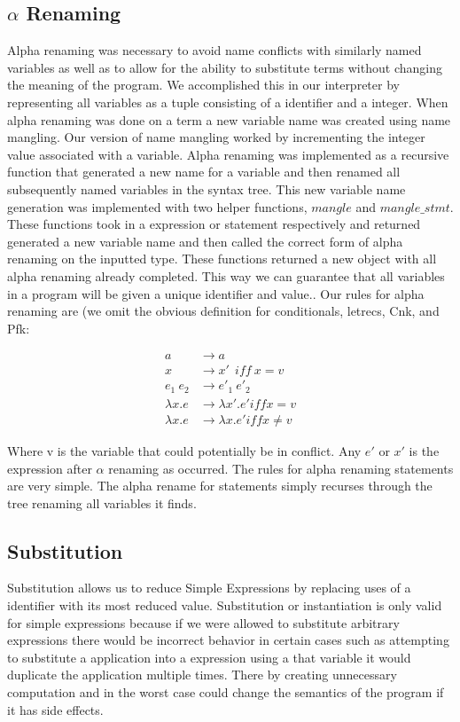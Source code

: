 \documentclass[preprint]{sigplanconf}
\begin{document}
\subsection{$\alpha$ Renaming}
Alpha renaming was necessary to avoid name conflicts with similarly named variables as well as to allow for the ability to substitute terms without changing the meaning of the program. We accomplished this in our interpreter by representing all variables as a tuple consisting of a identifier and a integer. When alpha renaming was done on a term a new variable name was created using name mangling. Our version of name mangling worked by incrementing the integer value associated with a variable. Alpha renaming was implemented as a recursive function that generated a new name for a variable and then renamed all subsequently named variables in the syntax tree. This new variable name generation was implemented with two helper functions, $mangle$ and $mangle\_stmt$. These functions took in a expression or statement respectively and returned generated a new variable name and then called the correct form of alpha renaming on the inputted type. These functions returned a new object with all alpha renaming already completed.  This way we can guarantee that all variables in a program will be given a unique identifier and value.. Our rules for alpha renaming are (we omit the obvious definition for conditionals, letrecs, Cnk, and Pfk: 

\begin{align}
a &\rightarrow a \\
x &\rightarrow x'\ \ iff\ x = v\\
e_{1}\ e_{2} &\rightarrow e'_{1}\ e'_{2}\\
\lambda x.e &\rightarrow  \lambda x'.e' iff x = v\\
\lambda x.e &\rightarrow  \lambda x.e' iff x \neq v
\end{align}

Where v is the variable that could potentially be in conflict. Any $e'$ or $x'$ is the expression after $\alpha$ renaming as occurred. The rules for alpha renaming statements are very simple. The alpha rename for statements simply recurses through the tree renaming all variables it finds. 

\subsection{Substitution}
Substitution allows us to reduce Simple Expressions by replacing uses of a identifier with its most reduced value. Substitution or instantiation is only valid for simple expressions because if we were allowed to substitute arbitrary expressions there would be incorrect behavior in certain cases such as attempting to substitute a application into a expression using a that variable it would duplicate the application multiple times. There by creating unnecessary computation and in the worst case could change the semantics of the program if it has side effects. 
\end{document}
